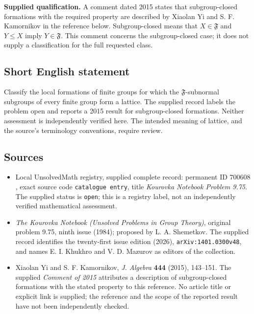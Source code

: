 \documentclass[11pt]{article}
\begin{document}
\textbf{Supplied qualification.} A comment dated 2015 states that subgroup-closed formations with the required property are described by Xiaolan Yi and S. F. Kamornikov in the reference below. Subgroup-closed means that \(X\in\mathfrak F\) and \(Y\leq X\) imply \(Y\in\mathfrak F\). This comment concerns the subgroup-closed case; it does not supply a classification for the full requested class.
\subsection{Short English statement}
Classify the local formations of finite groups for which the \(\mathfrak F\)-subnormal subgroups of every finite group form a lattice. The supplied record labels the problem open and reports a 2015 result for subgroup-closed formations. Neither assessment is independently verified here. The intended meaning of lattice, and the source's terminology conventions, require review.
\subsection{Sources}
\begin{itemize}
\item Local UnsolvedMath registry, supplied complete record: permanent ID \(700608\), exact source code \texttt{catalogue entry}, title \emph{Kourovka Notebook Problem 9.75}. The supplied status is \texttt{open}; this is a registry label, not an independently verified mathematical assessment.
\item \emph{The Kourovka Notebook (Unsolved Problems in Group Theory)}, original problem 9.75, ninth issue (1984); proposed by L. A. Shemetkov. The supplied record identifies the twenty-first issue edition (2026), \texttt{arXiv:1401.0300v48}, and names E. I. Khukhro and V. D. Mazurov as editors of the collection.
\item Xiaolan Yi and S. F. Kamornikov, \emph{J. Algebra} \textbf{444} (2015), 143--151. The supplied \emph{Comment of 2015} attributes a description of subgroup-closed formations with the stated property to this reference. No article title or explicit link is supplied; the reference and the scope of the reported result have not been independently checked.
\end{itemize}
\end{document}
